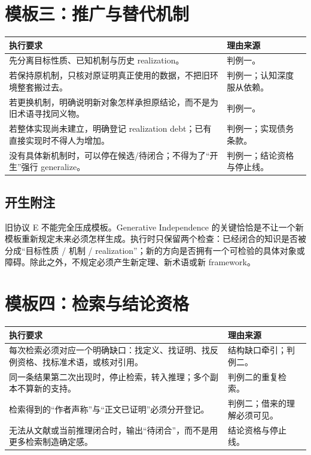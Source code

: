 \documentclass[UTF8,zihao=-4,fontset=none,oneside,openany]{ctexbook}
\begin{document}
\section{模板三：推广与替代机制}
\begin{tabularx}{\textwidth}{@{}X p{53mm}@{}}
\toprule
\textbf{执行要求} & \textbf{理由来源}\\
\midrule
先分离目标性质、已知机制与历史 realization。 & 判例一。\\
若保持原机制，只核对原证明真正使用的数据，不把旧环境整套搬过去。 & 判例一；认知深度服从依赖。\\
若更换机制，明确说明新对象怎样承担原结论，而不是为旧术语寻找同义物。 & 判例一。\\
若整体实现尚未建立，明确登记 realization debt；已有直接实现时不得人为增加。 & 判例一；实现债务条款。\\
没有具体新机制时，可以停在候选/待闭合；不得为了“开生”强行 generalize。 & 判例一；结论资格与停止线。\\
\bottomrule
\end{tabularx}

\subsection*{开生附注}
旧协议 E 不能完全压成模板。Generative Independence 的关键恰恰是不让一个新模板重新规定未来必须怎样生成。执行时只保留两个检查：已经闭合的知识是否被分成“目标性质 / 机制 / realization”；新的方向是否拥有一个可检验的具体对象或障碍。除此之外，不规定必须产生新定理、新术语或新 framework。

\section{模板四：检索与结论资格}
\begin{tabularx}{\textwidth}{@{}X p{53mm}@{}}
\toprule
\textbf{执行要求} & \textbf{理由来源}\\
\midrule
每次检索必须对应一个明确缺口：找定义、找证明、找反例资格、找标准术语，或核对引用。 & 结构缺口牵引；判例二。\\
同一条结果第二次出现时，停止检索，转入推理；多个副本不算新的支持。 & 判例二的重复检索。\\
检索得到的“作者声称”与“正文已证明”必须分开登记。 & 判例二；借来的理解必须可见。\\
无法从文献或当前推理闭合时，输出“待闭合”，而不是用更多检索制造确定感。 & 结论资格与停止线。\\
\bottomrule
\end{tabularx}
\end{document}
